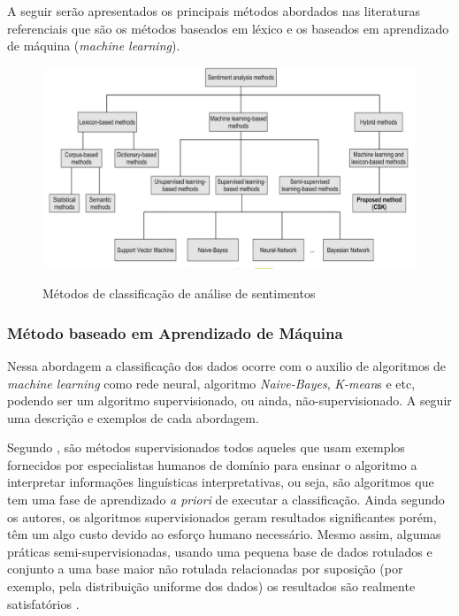 A seguir serão apresentados os principais métodos abordados nas literaturas referenciais que são os métodos baseados em léxico e os baseados em  aprendizado de máquina (\textit{machine learning}).

\begin{figure}[!h]
\centering 
\caption{Métodos de classificação de análise de sentimentos}
\includegraphics[scale=0.70]{imagens/sentimentanalysismethods.png}
\label{fig:SAMethods}
\end{figure}
\newpage

\subsubsection{Método baseado em Aprendizado de Máquina}

Nessa abordagem a classificação dos dados ocorre com o auxilio de algoritmos de \textit{machine learning} como rede neural, algoritmo \textit{Naive-Bayes}, \textit{K-mean}s e etc, podendo ser um algoritmo supervisionado, ou ainda, não-supervisionado. A seguir uma descrição e exemplos de cada abordagem.


Segundo , são métodos supervisionados todos aqueles que usam exemplos fornecidos por especialistas humanos de domínio para ensinar o algoritmo a interpretar informações linguísticas interpretativas, ou seja, são algoritmos que tem uma fase de aprendizado \textit{a priori} de executar a classificação. Ainda segundo os autores, os algoritmos supervisionados geram resultados significantes porém, têm um algo custo devido ao esforço humano necessário. Mesmo assim, algumas práticas semi-supervisionadas, usando uma pequena base de dados rotulados e conjunto a uma base maior não rotulada relacionadas por suposição (por exemplo, pela distribuição uniforme dos dados) os resultados são realmente satisfatórios \cite{TRUYENS2014153}.

